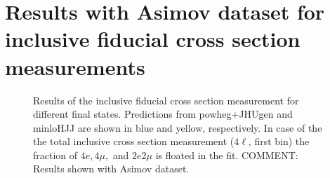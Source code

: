 \section{Results with Asimov dataset for inclusive fiducial cross section measurements}

\begin{figure}[!h!t]
  \begin{center}  
    \caption{Results of the inclusive fiducial cross section measurement for different final states. 
    Predictions from {\sc powheg+JHUgen} and {\sc minloHJJ} are shown in blue and yellow, respectively.
    In case of the the total inclusive cross section measurement ($4\ell$, first bin) the fraction of $4e,4\mu,$ and $2e2\mu$ is floated in the fit.
    COMMENT: Results shown with Asimov dataset.
    } 
  \label{fig:inclusive-results-asimov}
 \end{center}
\end{figure}

